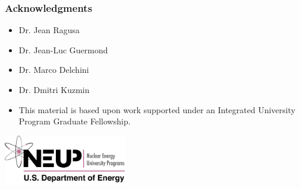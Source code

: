 \documentclass{beamer} \useoutertheme{infolines}
\begin{document}
\begin{frame}
\frametitle{Acknowledgments}

\begin{itemize}
   \item Dr. Jean Ragusa
   \item Dr. Jean-Luc Guermond
   \item Dr. Marco Delchini
   \item Dr. Dmitri Kuzmin
\end{itemize}
\begin{itemize}
   \item This material is based upon work supported under an Integrated University
      Program Graduate Fellowship.
\end{itemize}

\begin{center}
   \includegraphics[width=0.4\textwidth]{./figures/NEUP_Final_Logo_Version-09.jpg}
\end{center}
\end{frame}
\end{document}
